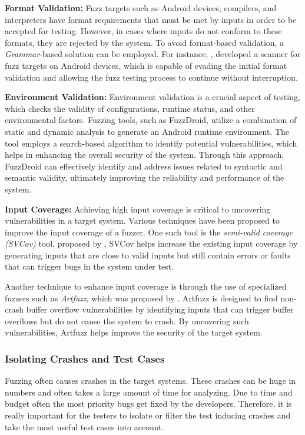\textbf{Format Validation:}
Fuzz targets such as Android devices, compilers, and interpreters have format requirements that
must be met by inputs in order to be accepted for testing. However, in cases where inputs
do not conform to these formats, they are rejected by the system. To avoid format-based validation,
a \textit{Grammar}-based solution can be employed. For instance, ,
developed a scanner for fuzz targets on Android devices, which is capable of evading the
initial format validation and allowing the fuzz testing process to continue without
interruption\cite{cao2015towards}.

\textbf{Environment Validation:}
Environment validation is a crucial aspect of testing, which checks the validity of configurations,
runtime status, and other environmental factors. Fuzzing tools, such as FuzzDroid\cite{rasthofer2017making},
utilize a combination of static and dynamic analysis to generate an Android runtime environment.
The tool employs a search-based algorithm to identify potential vulnerabilities, which helps in
enhancing the overall security of the system. Through this approach, FuzzDroid can effectively
identify and address issues related to syntactic and semantic validity, ultimately improving the
reliability and performance of the system.


\textbf{Input Coverage:}
Achieving high input coverage is critical to uncovering vulnerabilities in a target system.
Various techniques have been proposed to improve the input coverage of a fuzzer.
One such tool is the \textit{semi-valid coverage (SVCov)} tool, proposed by  ,
SVCov helps increase the existing input coverage by generating inputs that are close to
valid inputs but still contain errors or faults that can trigger bugs in the system under test\cite{tsankov2013semi}.

Another technique to enhance input coverage is through the use of specialized fuzzers such as \textit{Artfuzz},
which was proposed by . Artfuzz is designed to find non-crash buffer overflow
vulnerabilities by identifying inputs that can trigger buffer overflows but do not cause the system to crash.
By uncovering such vulnerabilities, Artfuzz helps improve the security of the target system\cite{chen2016dynamically}.

\subsubsection{Isolating Crashes and Test Cases}
Fuzzing often causes crashes in the target systems. These crashes can be huge in numbers and often
takes a large amount of time for analyzing. Due to time and budget often the most priority bugs get
fixed by the developers. Therefore, it is really important for the testers to isolate or filter
the test inducing crashes and take the most useful test cases into account.

